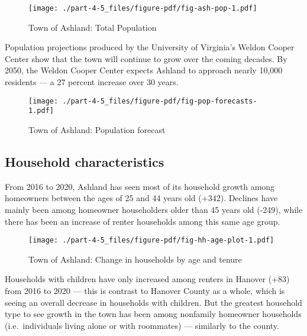 \documentclass[
  letterpaper,
  DIV=11,
  numbers=noendperiod]{scrreprt}
\begin{document}
\begin{figure}

{\centering \texttt{[image: ./part-4-5\_files/figure-pdf/fig-ash-pop-1.pdf]}

}

\caption{\label{fig-ash-pop}Town of Ashland: Total Population}

\end{figure}

Population projections produced by the University of Virginia's Weldon
Cooper Center show that the town will continue to grow over the coming
decades. By 2050, the Weldon Cooper Center expects Ashland to approach
nearly 10,000 residents --- a 27 percent increase over 30 years.

\begin{figure}

{\centering \texttt{[image: ./part-4-5\_files/figure-pdf/fig-pop-forecasts-1.pdf]}

}

\caption{\label{fig-pop-forecasts}Town of Ashland: Population forecast}

\end{figure}

\hypertarget{household-characteristics-4}{%
\subsection{Household
characteristics}\label{household-characteristics-4}}

From 2016 to 2020, Ashland has seen most of its household growth among
homeowners between the ages of 25 and 44 years old (+342). Declines have
mainly been among homeowner householders older than 45 years old (-249),
while there has been an increase of renter households among this same
age group.

\begin{figure}

{\centering \texttt{[image: ./part-4-5\_files/figure-pdf/fig-hh-age-plot-1.pdf]}

}

\caption{\label{fig-hh-age-plot}Town of Ashland: Change in households by
age and tenure}

\end{figure}

Households with children have only increased among renters in Hanover
(+83) from 2016 to 2020 --- this is contrast to Hanover County as a
whole, which is seeing an overall decrease in households with children.
But the greatest household type to see growth in the town has been among
nonfamily homeowner households (i.e.~individuals living alone or with
roommates) --- similarly to the county.
\end{document}
